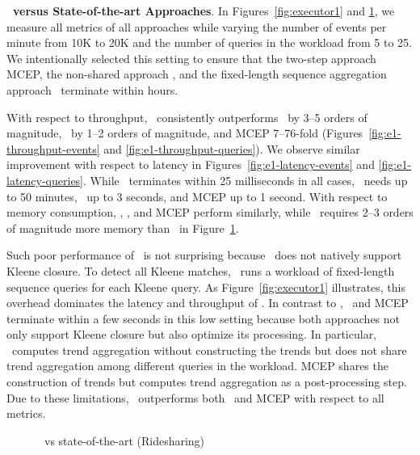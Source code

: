 \textbf{\app\ versus State-of-the-art Approaches}.
%
In Figures~\ref{fig:executor1} and \ref{fig:memory}, we measure all metrics of all approaches while varying the number of events per minute from 10K to 20K and the number of queries in the workload from 5 to 25. We intentionally selected this setting to ensure that the two-step approach MCEP, the non-shared approach \greta, and the fixed-length sequence aggregation approach \sharon\ terminate within hours.



With respect to throughput, \app\ consistently outperforms 
\sharon\ by 3--5 orders of magnitude,
\greta\ by 1--2 orders of magnitude, and
MCEP 7--76-fold
(Figures~\ref{fig:e1-throughput-events} and \ref{fig:e1-throughput-queries}).
%
We observe similar improvement with respect to latency in Figures~\ref{fig:e1-latency-events} and \ref{fig:e1-latency-queries}. 
While \app\ terminates within 25 milliseconds in all cases, 
\sharon\ needs up to 50 minutes, 
\greta\ up to 3 seconds, and 
MCEP up to 1 second.
% 
With respect to memory consumption, \app, \greta, and MCEP perform similarly, while \sharon\ requires 2--3 orders of magnitude more memory than \app\ in Figure~\ref{fig:memory}.

Such poor performance of \sharon\ is not surprising because \sharon\ does not natively support Kleene closure. To detect all Kleene matches, \sharon\ runs a workload of fixed-length sequence queries for each Kleene query. As Figure~\ref{fig:executor1} illustrates, this overhead dominates the latency and throughput of \sharon. 
In contrast to \sharon, \greta\ and MCEP terminate within a few seconds in this low setting because both approaches not only support Kleene closure but also optimize its processing. In particular, \greta\ computes trend aggregation without constructing the trends but does not share trend aggregation among different queries in the workload.
MCEP shares the construction of trends but computes trend aggregation as a post-processing step. Due to these limitations, \app\ outperforms both \greta\ and MCEP with respect to all metrics.

\begin{figure}[!htb]
	\centering
    \caption{\app\ vs state-of-the-art (Ridesharing)}
    \label{fig:memory}
\end{figure}


